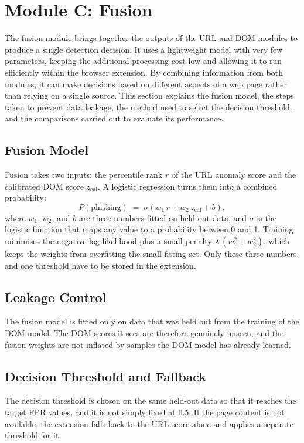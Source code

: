 \documentclass{FastFyp}
\begin{document}
\section{Module C: Fusion}
\label{sec:fusion}
The fusion module brings together the outputs of the URL and DOM modules to produce a single detection decision. It uses a lightweight model with very few parameters, keeping the additional processing cost low and allowing it to run efficiently within the browser extension. By combining information from both modules, it can make decisions based on different aspects of a web page rather than relying on a single source. This section explains the fusion model, the steps taken to prevent data leakage, the method used to select the decision threshold, and the comparisons carried out to evaluate its performance.

\subsection{Fusion Model}
Fusion takes two inputs: the percentile rank $r$ of the URL anomaly score and the calibrated DOM score $z_{\mathrm{cal}}$. A logistic regression turns them into a combined probability:
\begin{equation}
P(\text{phishing}) \;=\; \sigma\!\left(w_1\, r + w_2\, z_{\mathrm{cal}} + b\right),
\end{equation}
where $w_1$, $w_2$, and $b$ are three numbers fitted on held-out data, and $\sigma$ is the logistic function that maps any value to a probability between 0 and 1. Training minimises the negative log-likelihood plus a small penalty $\lambda\,(w_1^2 + w_2^2)$, which keeps the weights from overfitting the small fitting set. Only these three numbers and one threshold have to be stored in the extension.

\subsection{Leakage Control}
The fusion model is fitted only on data that was held out from the training of the DOM model. The DOM scores it sees are therefore genuinely unseen, and the fusion weights are not inflated by samples the DOM model has already learned.

\subsection{Decision Threshold and Fallback}
The decision threshold is chosen on the same held-out data so that it reaches the target FPR values, and it is not simply fixed at 0.5. If the page content is not available, the extension falls back to the URL score alone and applies a separate threshold for it.
\end{document}
